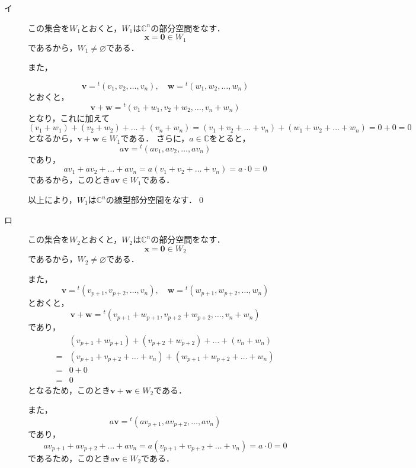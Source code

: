 \documentclass[uplatex,dvipdfmx,a4paper,11pt,fleqn]{jsarticle}
\begin{document}
\begin{leftbar}
    \begin{description}
        \item[イ] この集合を$W_1$とおくと，$W_1$は$\mathbb{C}^n$の部分空間をなす．
        \[
            \bm{x} =\bm{0} \in  W_1
        \] 
        であるから，$W_1 \ne \varnothing$である．
        
        また，

        \[
            \bm{v} = {}^t ( v_{1} , v_{2} , \ldots ,v_{n} ) , \quad \bm{w} = {}^t (w_{1} , w_{2} , \ldots , w_{n} )
        \]
        とおくと，
        \[
         \bm{v}+\bm{w}={}^t (v_1+w_1,v_2+w_2,\ldots,v_n + w_n)
        \]
        となり，これに加えて
        \[
           ( v_1+w_1)+(v_2+w_2) + \dots + (v_n + w_n) =(v_1+v_2+\dots + v_n ) + (w_1+w_2+\dots + w_n )=0+0=0
        \]
        となるから，$\bm{v}+\bm{w} \in W_1$である．
        さらに，$a \in \mathbb{C}$をとると，
        \[
            a \bm{v}={}^t ( av_{1} ,av_{2} , \ldots , av_{n} )
        \]
        であり，
        \[
           av_1 + av_2+ \dots + av_n = a (v_1 + v_2 + \dots + v_n) = a \cdot 0 =0
        \]
        であるから，このとき$ a \bm{v} \in W_1$である．
        
        以上により，$W_1$は$\mathbb{C}^n$の線型部分空間をなす．\qed 
        \item[ロ] この集合を$W_2$とおくと，$W_2$は$\mathbb{C}^n$の部分空間をなす．
        \[
            \bm{x} = \bm{0} \in W_2
        \]
        であるから，$W_2 \ne \varnothing$である．
        
        また，
        \[
            \bm{v} ={}^t (v_{p+1} , v_{p+2} , \ldots , v_{n} ) , \quad \bm{w} ={}^t ( w_{p+1} , w_{p+2} , \ldots , w_{n} )
        \]
        とおくと，
        \[
            \bm{v}+ \bm{w} = {}^t (v_{p+1}+w_{p+1},v_{p+2}+w_{p+2},\ldots,v_n + w_n)
        \]
        であり，
        \begin{align*}
           &( v_{p+1}+w_{p+1}) +(v_{p+2}+w_{p+2})+ \dots + (v_n+w_n) \\
           =& (v_{p+1}+v_{p+2}+\dots+v_n)+(w_{p+1}+w_{p+2}+\dots+w_n) \\
           =&0+0\\
           =&0
        \end{align*}
        となるため，このとき$\bm{v}+\bm{w} \in W_2$である．

        また，
        \[
            a\bm{v} = {}^t (av_{p+1},av_{p+2},\ldots,av_n)
        \]
        であり，
        \[
            av_{p+1} + av_{p+2}+\dots + av_n =a (v_{p+1}+v_{p+2}+\dots+v_n) = a\cdot 0 =0
        \]
        であるため，このとき$a \bm{v} \in W_2$である．


\end{description}
\end{leftbar}
\end{document}

